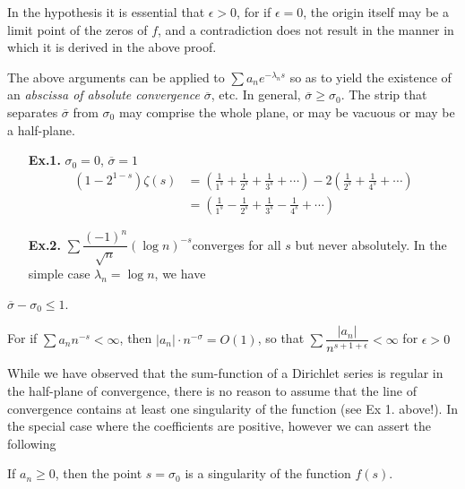 \begin{remark*}
In the hypothesis it is essential that $\epsilon >0$, for if
$\epsilon =0$, the origin itself may be a limit point of the zeros
of $f$, and a contradiction does not result in the manner in which it
is derived in the above proof.
\end{remark*}

The above arguments can be applied to $\sum a_n  e^{-\lambda_n s}$ so
as to yield the existence of an \textit{abscissa of absolute
  convergence } $\overline{\sigma}$, etc. In general, $\overline{\sigma} \geq
\sigma_0$. The strip that separates $\overline{\sigma}$ from $\sigma_0$ may
comprise the whole plane, or may be vacuous or may be a half-plane.
\begin{itemize}
\item[{\bf{Ex.1.}}] $\sigma_0 = 0$, $\overline{\sigma} = 1$
\begin{align*}
(1-2^{1-s}) \zeta(s) & = \left(\frac{1}{1^s} + \frac{1}{2^s} +
  \frac{1}{3^s} + \cdots  \right)  - 2 \left(\frac{1}{2^s} +
  \frac{1}{4^s} + \cdots \right)\\
& = \left(\frac{1}{1^s} - \frac{1}{2^s} + \frac{1}{3^s} -
  \frac{1}{4^s} + \cdots \right)
\end{align*}

\item[{\bf{Ex.2.}}] $\sum \dfrac{(-1)^n}{\sqrt{n}} (\log
  n)^{-s}$\pageoriginale converges for all $s$ but never
  absolutely. In the simple case $\lambda_n = \log n$, we have
\end{itemize}


\begin{thm}\label{chap9:thm6}
$\overline{\sigma} - \sigma_0 \leq 1$.

For if $\sum a_n n^{-s} < \infty$, then $|a_n|\cdot n^{-\sigma} = O
(1)$, so that $\sum \dfrac{|a_n|}{n^{s+1+\epsilon}} < \infty$ for
$\epsilon >0$

While we have observed that the sum-function of a Dirichlet series is
regular in the half-plane of convergence, there is no reason to assume
that the line of convergence contains at least one singularity of the
function (see Ex 1. above!). In the special case where the
coefficients are positive, however we can assert the following 
\end{thm}


\begin{thm}\label{chap9:thm7}
If $a_n \geq 0$, then the point $s = \sigma_0$ is a singularity of the
function $f(s)$.
\end{thm}

